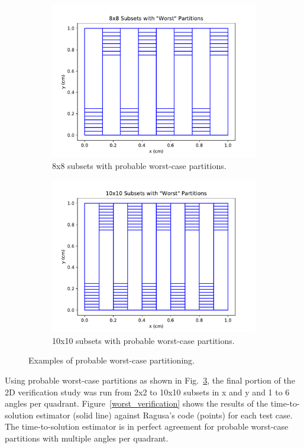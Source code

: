 \begin{figure}[H]
\begin{subfigure}[b]{0.45\textwidth}
  \includegraphics[width=\textwidth]{../cut_line_files/8_worst.pdf}
  \caption{8x8 subsets with probable worst-case partitions.}
  \label{8random}
\end{subfigure}
\begin{subfigure}[b]{0.45\textwidth}
  \includegraphics[width=\textwidth]{../cut_line_files/10_worst.pdf}
  \caption{10x10 subsets with probable worst-case partitions.}
  \label{10random}
\end{subfigure}
\caption{Examples of probable worst-case partitioning.}
\label{worst_partitions}
\end{figure}
Using probable worst-case partitions as shown in Fig.~\ref{worst_partitions}, the final portion of the 2D verification study was run from 2x2 to 10x10 subsets in x and y and 1 to 6 angles per quadrant.  Figure~\ref{worst_verification} shows the results of the time-to-solution estimator (solid line) against Ragusa's code (points) for each test case. The time-to-solution estimator is in perfect agreement for probable worst-case partitions with multiple angles per quadrant.
